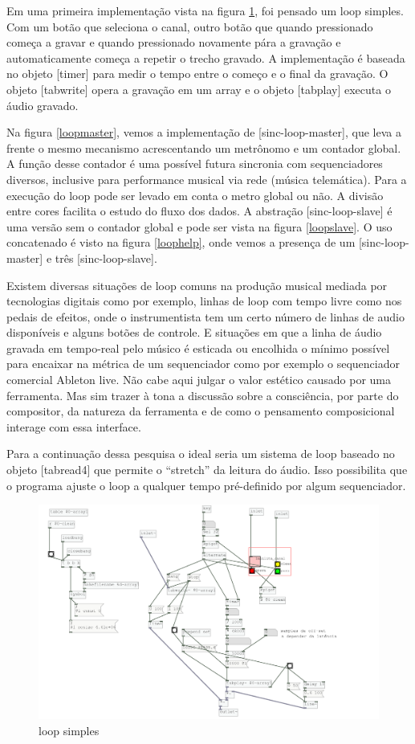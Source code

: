 \documentclass{ppgmus}
\begin{document}
Em uma primeira implementação  vista na figura \ref{sinc-looper}, foi pensado um loop simples. Com um botão
que seleciona o canal, outro botão que quando pressionado começa 
a gravar e quando pressionado novamente pára a gravação e automaticamente
começa a repetir o trecho gravado. A implementação é baseada no objeto
[timer] para medir o tempo entre o começo e o final da gravação. O objeto
[tabwrite\texttildelow] opera a gravação em um array e o objeto [tabplay\texttildelow]
executa o áudio gravado.

Na figura \ref{loopmaster}, vemos a implementação de [sinc-loop-master], que leva a frente
o mesmo mecanismo acrescentando um metrônomo e um contador global. A função desse contador
é uma possível futura sincronia com sequenciadores diversos, inclusive para performance
musical via rede (música telemática). Para a execução do loop pode ser levado em conta
o metro global ou não. A divisão entre cores facilita o estudo do fluxo dos dados.
A abstração [sinc-loop-slave] é uma versão sem o contador global e pode ser vista
na figura \ref{loopslave}. O uso concatenado é visto na figura \ref{loophelp}, onde vemos
a presença de um [sinc-loop-master] e três [sinc-loop-slave].


 Existem diversas situações de loop comuns na produção musical mediada por tecnologias digitais
como por exemplo, linhas de loop com tempo livre como nos pedais de efeitos, onde o instrumentista
tem um certo número de linhas de audio disponíveis e alguns botões de controle.
E situações em que a linha de áudio gravada em tempo-real pelo músico é esticada ou encolhida o mínimo
possível para encaixar na métrica de um sequenciador como por exemplo o sequenciador
comercial Ableton live. Não cabe aqui julgar o valor estético causado por uma ferramenta. Mas sim
trazer à tona a discussão sobre a consciência, por parte do compositor, da natureza da ferramenta 
e de como o pensamento composicional interage com essa interface.


Para a continuação dessa pesquisa o ideal seria um sistema de loop baseado no objeto 
[tabread4\texttildelow] que permite o ``stretch'' da leitura do áudio. Isso possibilita que o programa
ajuste o loop a qualquer tempo pré-definido por algum sequenciador.

\begin{figure}
\includegraphics[scale=.5]{sinc-looper}
\caption{loop simples}
\label{sinc-looper}
\end{figure}
\end{document}

